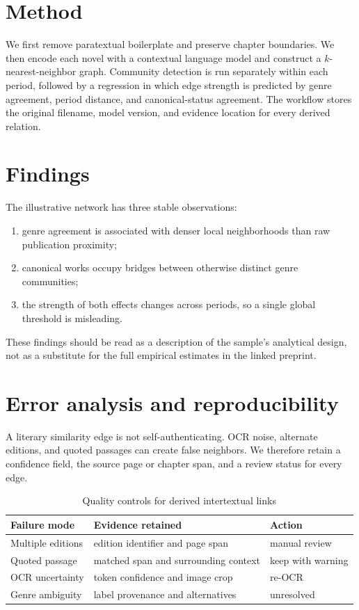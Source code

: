 \documentclass[11pt,a4paper]{article}
\begin{document}
\section{Method}
We first remove paratextual boilerplate and preserve chapter boundaries. We then encode each novel with a contextual language model and construct a $k$-nearest-neighbor graph. Community detection is run separately within each period, followed by a regression in which edge strength is predicted by genre agreement, period distance, and canonical-status agreement. The workflow stores the original filename, model version, and evidence location for every derived relation.
\section{Findings}
The illustrative network has three stable observations:
\begin{enumerate}
\item genre agreement is associated with denser local neighborhoods than raw publication proximity;
\item canonical works occupy bridges between otherwise distinct genre communities;
\item the strength of both effects changes across periods, so a single global threshold is misleading.
\end{enumerate}
These findings should be read as a description of the sample's analytical design, not as a substitute for the full empirical estimates in the linked preprint.
\newpage
\section{Error analysis and reproducibility}
A literary similarity edge is not self-authenticating. OCR noise, alternate editions, and quoted passages can create false neighbors. We therefore retain a confidence field, the source page or chapter span, and a review status for every edge.
\begin{table}[ht]
\centering
\caption{Quality controls for derived intertextual links}
\begin{tabularx}{0.96\linewidth}{p{35mm}X p{25mm}}
\toprule
Failure mode & Evidence retained & Action\\
\midrule
Multiple editions & edition identifier and page span & manual review\\
Quoted passage & matched span and surrounding context & keep with warning\\
OCR uncertainty & token confidence and image crop & re-OCR\\
Genre ambiguity & label provenance and alternatives & unresolved\\
\bottomrule
\end{tabularx}
\end{table}
\end{document}
